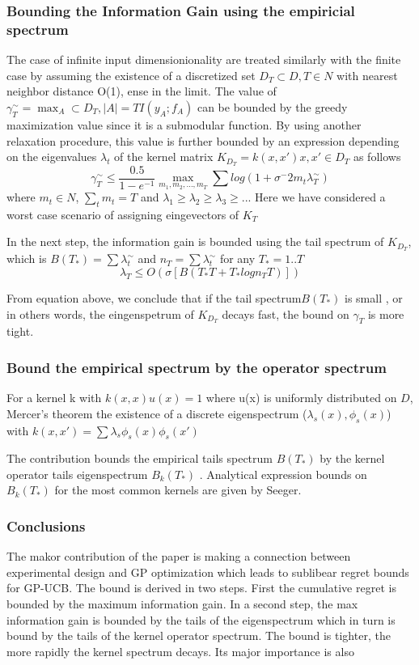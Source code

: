 \documentclass[10pt,journal,a4paper]{IEEEtran}
\begin{document}
\subsubsection{Bounding the Information Gain using the empiricial spectrum}
The case of  infinite input dimensionionality are treated similarly with the finite case by assuming the existence of a discretized set $D_T \subset D, T \in N $ with nearest neighbor distance O(1), ense in the limit. The value of $\gamma_T^{\sim}= \max_A\subset D_T, |A|=T I(y_A; f_A)$ can be bounded by the greedy maximization value since it is a submodular function. By using another relaxation procedure, this value is further bounded by an expression depending on the eigenvalues $\lambda_t$ of the kernel matrix $K_{D_T} = k(x,x') x,x' \in D_T$ as follows
\begin{equation}
	\gamma_T^{\sim} \leq \frac{0.5}{1-e^{-1}} \max_{m_1,m_2,...,m_T} \sum log(1 + \sigma^-2m_t\lambda_T^{\sim})
\end{equation}
where $m_t\in N$, $\sum_t m_t = T$ and $\lambda_1 \geq \lambda_2 \geq \lambda_3 \geq ..$. Here we have considered a worst case scenario of assigning eingevectors of $K_T$

In the next step, the information gain is bounded using the tail spectrum of $K_{D_T}$, which is 
$B(T_{*}) = \sum\lambda_t^{\sim}$ and $n_T = \sum \lambda_t^{\sim}$ for any $T_{*}=1..T$
\begin{equation}
\lambda_{T} \leq O(\sigma[B(T_{*}T + T_{*}logn_T T)])
\end{equation}

From equation above, we conclude that if the tail spectrum$B(T_{*})$ is small , or in others words, the eingenspetrum of $K_{D_T}$ decays fast, the bound on $\gamma_T$ is more tight.
\subsubsection{Bound the empirical spectrum by the operator spectrum}
For a kernel k with $k(x,x)u(x)=1$ where u(x) is uniformly distributed on $D$, Mercer's theorem the existence of a discrete eigenspectrum {($\lambda_s(x), \phi_s(x)$)}
with $k(x,x') = \sum \lambda_s\phi_s(x) \phi_s(x')$

The contribution bounds the empirical tails spectrum $B(T_{*})$ by the kernel operator tails eigenspectrum $B_k(T_{*})$ .
Analytical expression bounds on $B_k(T_{*})$ for the most common kernels are given by Seeger.


\subsubsection{Conclusions}
The makor contribution of the paper is making a connection between experimental design and GP optimization which leads to sublibear regret bounds for GP-UCB. 
The bound is derived in two steps. First the cumulative regret is bounded by the maximum information gain. In a second step, the max information gain is bounded by the tails of the eigenspectrum which in turn is bound by the tails of the kernel operator spectrum.
The bound is tighter, the more rapidly the kernel spectrum decays. Its major importance is also
\end{document}

